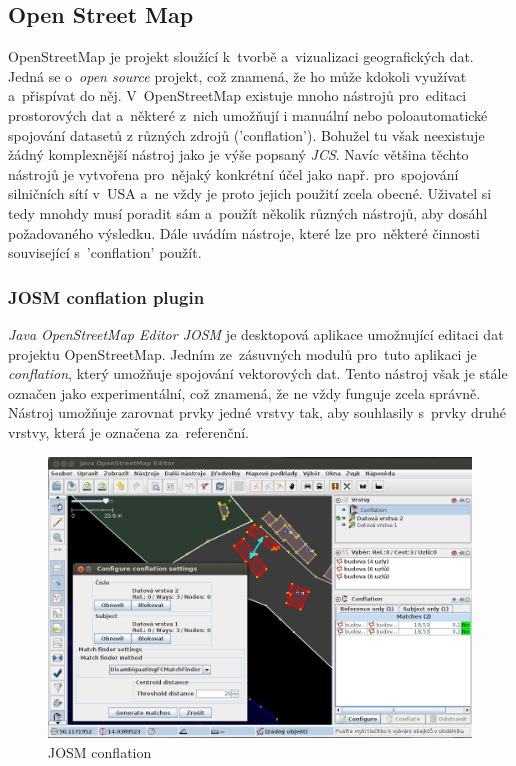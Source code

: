 
\subsection{Open Street Map}

OpenStreetMap je projekt sloužící k~tvorbě a~vizualizaci geografických dat. Jedná se o~\textit{open source} projekt, což znamená, že ho může kdokoli využívat a~přispívat do něj.
V~OpenStreetMap existuje mnoho nástrojů pro~editaci prostorových dat a~některé z~nich umožňují i manuální nebo poloautomatické spojování datasetů z různých zdrojů ('conflation').
Bohužel tu však neexistuje žádný komplexnější nástroj jako je výše popsaný \textit{JCS}. Navíc většina těchto nástrojů je vytvořena pro~nějaký konkrétní účel jako např. 
pro~spojování silničních sítí v~USA a~ne vždy je proto jejich použití zcela obecné. Uživatel si tedy mnohdy musí poradit sám a~použít několik různých nástrojů, aby dosáhl
požadovaného výsledku. Dále uvádím nástroje, které lze pro~některé činnosti související s~'conflation' použít. 

\subsubsection{JOSM conflation plugin}

\textit{Java OpenStreetMap Editor JOSM} je desktopová aplikace umožnující editaci dat projektu OpenStreetMap. Jedním ze~zásuvných modulů pro~tuto aplikaci je \textit{conflation},
který umožňuje spojování vektorových dat. Tento nástroj však je stále označen jako experimentální, což znamená, že ne vždy funguje zcela správně. Nástroj umožňuje zarovnat
prvky jedné vrstvy tak, aby souhlasily s~prvky druhé vrstvy, která je označena za~referenční. 

\label{josmpic}
  \begin{figure}[hbt]
    \centering
      \includegraphics[width=350pt]{./pictures/josm.png}
      \caption{JOSM conflation}
      \label{fig:josm}
  \end{figure} 

